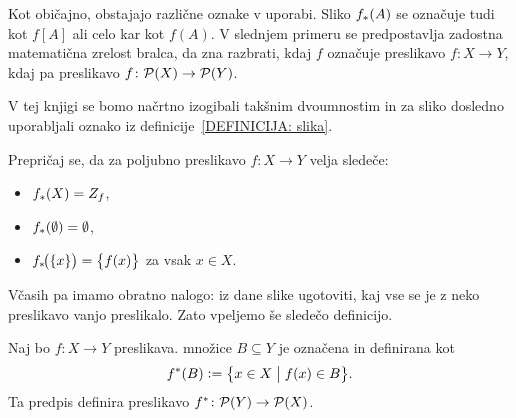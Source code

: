                 \begin{opomba}
                        Kot običajno, obstajajo različne oznake v uporabi. Sliko $\img{f}{A}$ se označuje tudi kot $f[A]$ ali celo kar kot $f(A)$. V slednjem primeru se predpostavlja zadostna matematična zrelost bralca, da zna razbrati, kdaj $f$ označuje preslikavo $f\colon X \to Y$, kdaj pa preslikavo $f\colon \mathcal{P}(X) \to \mathcal{P}(Y)$.

                        V tej knjigi se bomo načrtno izogibali takšnim dvoumnostim in za sliko dosledno uporabljali oznako iz definicije~\ref{DEFINICIJA: slika}.
                \end{opomba}

                \begin{vaja}
                        Prepričaj se, da za poljubno preslikavo $f\colon X \to Y$ velja sledeče:
                        \begin{itemize}
                                \item
                                        $\img{f}{X} = \rn{f}$,
                                \item
                                        $\img{f}{\emptyset} = \emptyset$,
                                \item
                                        $\img[1]{f}{\set{x}} = \set[1]{f(x)}$ za vsak $x \in X$.
                        \end{itemize}
                \end{vaja}


                Včasih pa imamo obratno nalogo: iz dane slike ugotoviti, kaj vse se je z neko preslikavo vanjo preslikalo. Zato vpeljemo še sledečo definicijo.

                \begin{definicija}\label{DEFINICIJA: praslika}
                        Naj bo $f\colon X \to Y$ preslikava.  množice $B \subseteq Y$ je označena in definirana kot
                        \[\pim{f}{B} \dfeq \set[1]{x \in X}{f(x) \in B}.\]
                        Ta predpis definira preslikavo $\pim{f}\colon \pst(Y) \to \pst(X)$.
                \end{definicija}

